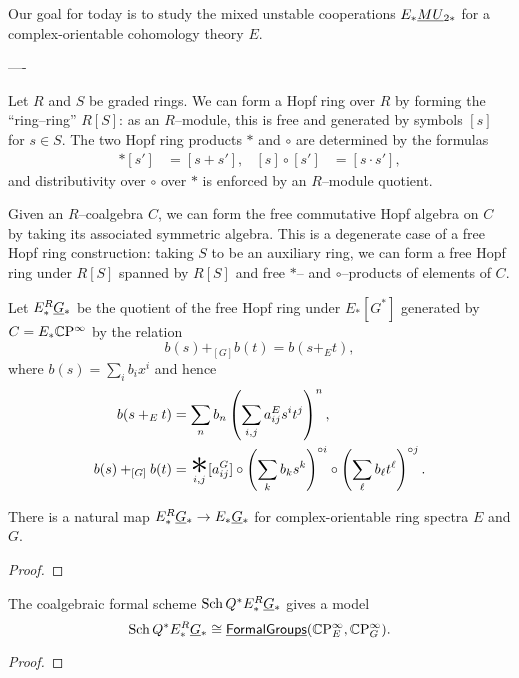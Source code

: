 Our goal for today is to study the mixed unstable cooperations $E_* \smash{\underline{MU}}_{2*}$ for a complex-orientable cohomology theory $E$.

----


Let $R$ and $S$ be graded rings.  We can form a Hopf ring over $R$ by forming the ``ring--ring'' $R[S]$: as an $R$--module, this is free and generated by symbols $[s]$ for $s \in S$.  The two Hopf ring products $\ast$ and $\circ$ are determined by the formulas
\begin{align*}
[s] \ast [s'] & = [s + s'], &
[s] \circ [s'] & = [s \cdot s'],
\end{align*}
and distributivity over $\circ$ over $\ast$ is enforced by an $R$--module quotient.

Given an $R$--coalgebra $C$, we can form the free commutative Hopf algebra on $C$ by taking its associated symmetric algebra.  This is a degenerate case of a free Hopf ring construction: taking $S$ to be an auxiliary ring, we can form a free Hopf ring under $R[S]$ spanned by $R[S]$ and free $\ast$-- and $\circ$--products of elements of $C$.

\begin{definition}
Let $E_*^R \smash{\underline{G}}_{*}$ be the quotient of the free Hopf ring under $E_*[G^*]$ generated by $C = E_* \mathbb{C}\mathrm P^\infty$ by the relation \[b(s) +_{[G]} b(t) = b(s +_E t),\] where $b(s) = \sum_i b_i x^i$ and hence
\begin{align*}
b(s +_E t) & = \sum_n b_n \left(\sum_{i, j} a_{ij}^E s^i t^j \right)^n, \\
b(s) +_{[G]} b(t) & = \bigast_{i, j} [a_{ij}^G] \circ \left( \sum_k b_k s^k \right)^{\circ i} \circ \left( \sum_\ell b_\ell t^\ell \right)^{\circ j}.
\end{align*}
\end{definition}

\begin{lemma}
There is a natural map $E_*^R \smash{\underline{G}}_{*} \to E_* \smash{\underline{G}}_{*}$ for complex-orientable ring spectra $E$ and $G$.
\end{lemma}
\begin{proof}
\end{proof}

\begin{theorem}
The coalgebraic formal scheme $\operatorname{Sch} Q^* E_*^R \smash{\underline{G}}_{*}$ gives a model \[\operatorname{Sch} Q^* E_*^R \smash{\underline{G}}_{*} \cong \operatorname{\underline{\smash{\mathsf{FormalGroups}}}}(\mathbb{C}\mathrm P^\infty_E, \mathbb{C}\mathrm P^\infty_G).\]
\end{theorem}
\begin{proof}
\end{proof}

